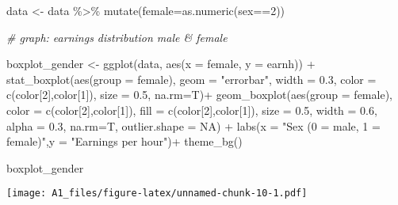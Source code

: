 \documentclass[
]{article}
\newenvironment{Shaded}{\begin{snugshade}}{\end{snugshade}}
\newcommand{\AttributeTok}[1]{\textcolor[rgb]{0.77,0.63,0.00}{#1}}
\newcommand{\CommentTok}[1]{\textcolor[rgb]{0.56,0.35,0.01}{\textit{#1}}}
\newcommand{\ConstantTok}[1]{\textcolor[rgb]{0.00,0.00,0.00}{#1}}
\newcommand{\DecValTok}[1]{\textcolor[rgb]{0.00,0.00,0.81}{#1}}
\newcommand{\FloatTok}[1]{\textcolor[rgb]{0.00,0.00,0.81}{#1}}
\newcommand{\FunctionTok}[1]{\textcolor[rgb]{0.00,0.00,0.00}{#1}}
\newcommand{\NormalTok}[1]{#1}
\newcommand{\OtherTok}[1]{\textcolor[rgb]{0.56,0.35,0.01}{#1}}
\newcommand{\SpecialCharTok}[1]{\textcolor[rgb]{0.00,0.00,0.00}{#1}}
\newcommand{\StringTok}[1]{\textcolor[rgb]{0.31,0.60,0.02}{#1}}
\begin{document}
\begin{Shaded}
\begin{Highlighting}[]
\NormalTok{data }\OtherTok{\textless{}{-}}\NormalTok{ data }\SpecialCharTok{\%\textgreater{}\%} \FunctionTok{mutate}\NormalTok{(}\AttributeTok{female=}\FunctionTok{as.numeric}\NormalTok{(sex}\SpecialCharTok{==}\DecValTok{2}\NormalTok{))}

\CommentTok{\#  graph: earnings distribution male \& female}

\NormalTok{boxplot\_gender }\OtherTok{\textless{}{-}} \FunctionTok{ggplot}\NormalTok{(data, }\FunctionTok{aes}\NormalTok{(}\AttributeTok{x =}\NormalTok{ female, }\AttributeTok{y =}\NormalTok{ earnh)) }\SpecialCharTok{+}
  \FunctionTok{stat\_boxplot}\NormalTok{(}\FunctionTok{aes}\NormalTok{(}\AttributeTok{group =}\NormalTok{ female), }\AttributeTok{geom =} \StringTok{"errorbar"}\NormalTok{, }\AttributeTok{width =} \FloatTok{0.3}\NormalTok{,}
               \AttributeTok{color =} \FunctionTok{c}\NormalTok{(color[}\DecValTok{2}\NormalTok{],color[}\DecValTok{1}\NormalTok{]), }\AttributeTok{size =} \FloatTok{0.5}\NormalTok{, }\AttributeTok{na.rm=}\NormalTok{T)}\SpecialCharTok{+}
  \FunctionTok{geom\_boxplot}\NormalTok{(}\FunctionTok{aes}\NormalTok{(}\AttributeTok{group =}\NormalTok{ female),}
               \AttributeTok{color =} \FunctionTok{c}\NormalTok{(color[}\DecValTok{2}\NormalTok{],color[}\DecValTok{1}\NormalTok{]), }\AttributeTok{fill =} \FunctionTok{c}\NormalTok{(color[}\DecValTok{2}\NormalTok{],color[}\DecValTok{1}\NormalTok{]),}
               \AttributeTok{size =} \FloatTok{0.5}\NormalTok{, }\AttributeTok{width =} \FloatTok{0.6}\NormalTok{, }\AttributeTok{alpha =} \FloatTok{0.3}\NormalTok{, }\AttributeTok{na.rm=}\NormalTok{T, }\AttributeTok{outlier.shape =} \ConstantTok{NA}\NormalTok{) }\SpecialCharTok{+}
  \FunctionTok{labs}\NormalTok{(}\AttributeTok{x =} \StringTok{"Sex (0 = male, 1 = female)"}\NormalTok{,}\AttributeTok{y =} \StringTok{"Earnings per hour"}\NormalTok{)}\SpecialCharTok{+}
  \FunctionTok{theme\_bg}\NormalTok{()}

\NormalTok{boxplot\_gender}
\end{Highlighting}
\end{Shaded}

\texttt{[image: A1\_files/figure-latex/unnamed-chunk-10-1.pdf]}

\begin{Shaded}
\end{Shaded}
\end{document}

